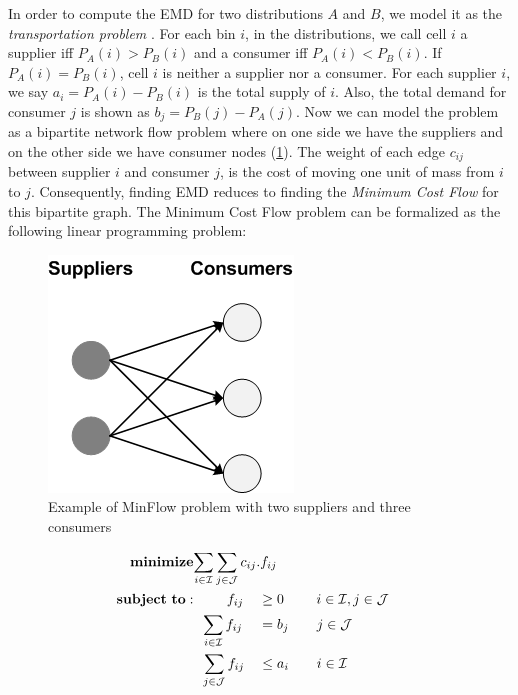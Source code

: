 In order to compute the EMD for two distributions $A$ and $B$, we model it as the  \textit{transportation problem} \cite{Dantzig51}. For each bin $i$, in the distributions, we call cell $i$ a supplier iff $P_A(i) > P_B(i)$ and a consumer iff $P_A(i) < P_B(i)$. If $P_A(i) = P_B(i)$, cell $i$ is neither a supplier nor a consumer. For each supplier $i$, we say $a_i = P_A(i) - P_B(i)$ is the total supply of $i$. Also, the total demand for consumer $j$ is shown as $b_j = P_B(j) - P_A(j)$. Now we can model the problem as a bipartite network flow problem where on one side we have the suppliers and on the other side we have consumer nodes (\cref{fig:MinFlow}). The weight of each edge $c_{ij}$ between supplier $i$ and consumer $j$, is the cost of moving one unit of mass from $i$ to $j$.  Consequently, finding EMD reduces to finding the \textit{Minimum Cost Flow} for this bipartite graph. The Minimum Cost Flow problem can be formalized as the following linear programming problem:\\

\begin{figure}[t]
  \centering
  \label{fig:MinFlow}
  \includegraphics[scale=0.5]{figures/MinFlow.png}
  \vspace{-0.2cm}
  \caption{Example of MinFlow problem with two suppliers and three consumers}
\end{figure}

\setcounter{equation}{0}
\begin{alignat}{2}
\mathbf{minimize}&\mathrlap{\sum_{i \in \mathcal{I}} \sum_{j \in \mathcal{J}} c_{ij}.f_{ij}} \notag\\
\mathbf{subject\ to:}&\phantom{{a}={a}} f_{ij} && \geq 0 \ \quad\quad i \in \mathcal{I}, j \in \mathcal{J}\\
&\phantom{{a}}\sum_{i \in \mathcal{I}} f_{ij} &&= b_j \quad\quad j \in \mathcal{J}\\
&\phantom{{a}}\sum_{j \in \mathcal{J}} f_{ij} &&\leq a_i \quad\quad i \in \mathcal{I}
\end{alignat}

